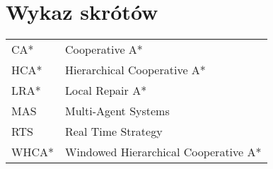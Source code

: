 \chapter*{Wykaz skrótów}

\begin{tabular}{l l}
CA* & Cooperative A* \\
HCA* & Hierarchical Cooperative A* \\
LRA* & Local Repair A* \\
MAS & Multi-Agent Systems \\
RTS & Real Time Strategy \\
WHCA* & Windowed Hierarchical Cooperative A* \\

\end{tabular}
